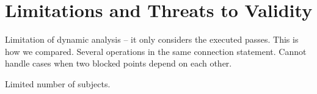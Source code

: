 \section{Limitations and Threats to Validity}
\label{sec:limitations}

Limitation of dynamic analysis -- it only considers the executed passes. This is how we compared. 
Several operations in the same connection statement.
Cannot handle cases when two blocked points depend on each other.

Limited number of subjects.

